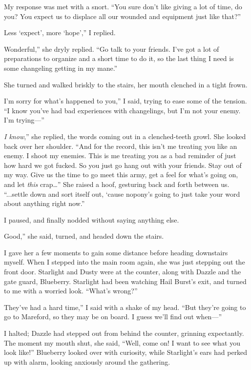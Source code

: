 My response was met with a snort. “You sure don’t like giving a lot of time, do you? You expect us to displace all our wounded and equipment just like that?”

\leavevmode{}Less ‘expect’, more ‘hope’,” I replied.

\leavevmode{}Wonderful,” she dryly replied. “Go talk to your friends. I’ve got a lot of preparations to organize and a short time to do it, so the last thing I need is some changeling getting in my mane.”

She turned and walked briskly to the stairs, her mouth clenched in a tight frown.

\leavevmode{}I’m sorry for what’s happened to you,” I said, trying to ease some of the tension. “I know you’ve had bad experiences with changelings, but I’m not your enemy. I’m trying—”

\leavevmode{}\textit{I know},” she replied, the words coming out in a clenched-teeth growl. She looked back over her shoulder. “And for the record, this isn’t me treating you like an enemy. I shoot my enemies. This is me treating you as a bad reminder of just how hard we got fucked. So you just go hang out with your friends. Stay out of my way. Give us the time to go meet this army, get a feel for what’s going on, and let \textit{this} crap…” She raised a hoof, gesturing back and forth between us. “...settle down and sort itself out, ‘cause nopony’s going to just take your word about anything right now.”

I paused, and finally nodded without saying anything else.

\leavevmode{}Good,” she said, turned, and headed down the stairs.

I gave her a few moments to gain some distance before heading downstairs myself. When I stepped into the main room again, she was just stepping out the front door. Starlight and Dusty were at the counter, along with Dazzle and the gate guard, Blueberry. Starlight had been watching Hail Burst’s exit, and turned to me with a worried look. “What’s wrong?”

\leavevmode{}They’ve had a hard time,” I said with a shake of my head. “But they’re going to go to Mareford, so they may be on board. I guess we’ll find out when—”

I halted; Dazzle had stepped out from behind the counter, grinning expectantly. The moment my mouth shut, she said, “Well, come on! I want to see what you look like!” Blueberry looked over with curiosity, while Starlight’s ears had perked up with alarm, looking anxiously around the gathering.

